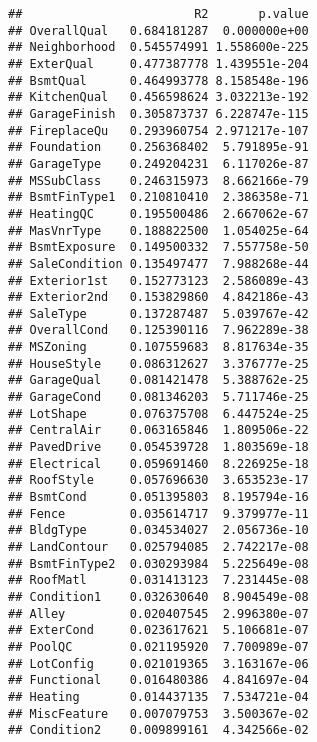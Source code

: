 \documentclass[
]{article}
\newenvironment{Shaded}{\begin{snugshade}}{\end{snugshade}}
\newcommand{\DecValTok}[1]{\textcolor[rgb]{0.00,0.00,0.81}{#1}}
\newcommand{\FunctionTok}[1]{\textcolor[rgb]{0.13,0.29,0.53}{\textbf{#1}}}
\newcommand{\NormalTok}[1]{#1}
\newcommand{\OtherTok}[1]{\textcolor[rgb]{0.56,0.35,0.01}{#1}}
\newcommand{\SpecialCharTok}[1]{\textcolor[rgb]{0.81,0.36,0.00}{\textbf{#1}}}
\begin{document}
\begin{verbatim}
##                        R2       p.value
## OverallQual   0.684181287  0.000000e+00
## Neighborhood  0.545574991 1.558600e-225
## ExterQual     0.477387778 1.439551e-204
## BsmtQual      0.464993778 8.158548e-196
## KitchenQual   0.456598624 3.032213e-192
## GarageFinish  0.305873737 6.228747e-115
## FireplaceQu   0.293960754 2.971217e-107
## Foundation    0.256368402  5.791895e-91
## GarageType    0.249204231  6.117026e-87
## MSSubClass    0.246315973  8.662166e-79
## BsmtFinType1  0.210810410  2.386358e-71
## HeatingQC     0.195500486  2.667062e-67
## MasVnrType    0.188822500  1.054025e-64
## BsmtExposure  0.149500332  7.557758e-50
## SaleCondition 0.135497477  7.988268e-44
## Exterior1st   0.152773123  2.586089e-43
## Exterior2nd   0.153829860  4.842186e-43
## SaleType      0.137287487  5.039767e-42
## OverallCond   0.125390116  7.962289e-38
## MSZoning      0.107559683  8.817634e-35
## HouseStyle    0.086312627  3.376777e-25
## GarageQual    0.081421478  5.388762e-25
## GarageCond    0.081346203  5.711746e-25
## LotShape      0.076375708  6.447524e-25
## CentralAir    0.063165846  1.809506e-22
## PavedDrive    0.054539728  1.803569e-18
## Electrical    0.059691460  8.226925e-18
## RoofStyle     0.057696630  3.653523e-17
## BsmtCond      0.051395803  8.195794e-16
## Fence         0.035614717  9.379977e-11
## BldgType      0.034534027  2.056736e-10
## LandContour   0.025794085  2.742217e-08
## BsmtFinType2  0.030293984  5.225649e-08
## RoofMatl      0.031413123  7.231445e-08
## Condition1    0.032630640  8.904549e-08
## Alley         0.020407545  2.996380e-07
## ExterCond     0.023617621  5.106681e-07
## PoolQC        0.021195920  7.700989e-07
## LotConfig     0.021019365  3.163167e-06
## Functional    0.016480386  4.841697e-04
## Heating       0.014437135  7.534721e-04
## MiscFeature   0.007079753  3.500367e-02
## Condition2    0.009899161  4.342566e-02
\end{verbatim}

\begin{Shaded}
\end{Shaded}
\end{document}
